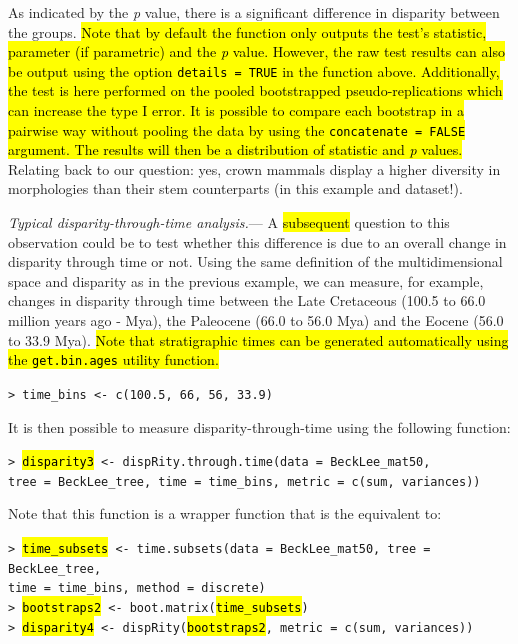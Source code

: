 \documentclass[12pt,letterpaper]{article}
\renewcommand{\subsubsection}[1]{%
\vspace{2ex}
\noindent
\textit{#1.}---}
\begin{document}
\bigskip
As indicated by the \textit{p} value, there is a significant difference in disparity between the groups.
\hl{Note that by default the function only outputs the test's statistic, parameter (if parametric) and the \textit{p} value. However, the raw test results can also be output using the option \texttt{details = TRUE} in the function above.
Additionally, the test is here performed on the pooled bootstrapped pseudo-replications which can increase the type I error.
It is possible to compare each bootstrap in a pairwise way without pooling the data by using the \texttt{concatenate = FALSE} argument.
The results will then be a distribution of statistic and \textit{p} values.}
Relating back to our question: yes, crown mammals display a higher diversity in morphologies than their stem counterparts (in this example and dataset!).

\subsubsection{Typical disparity-through-time analysis}
A 
\hl{subsequent} 
question to this observation could be to test whether this difference is due to an overall change in disparity through time or not.
Using the same definition of the multidimensional space and disparity as in the previous example, we can measure, for example, changes in disparity through time between the Late Cretaceous (100.5 to 66.0 million years ago - Mya), the Paleocene (66.0 to 56.0 Mya) and the Eocene (56.0 to 33.9 Mya).
\hl{Note that stratigraphic times can be generated automatically using the \texttt{get.bin.ages} utility function.}

\noindent
\texttt{> time\_bins <- c(100.5, 66, 56, 33.9)}

It is then possible to measure disparity-through-time using the following function:

\noindent
\texttt{> \hl{disparity3} <- dispRity.through.time(data = BeckLee\_mat50,}\\
\texttt{tree = BeckLee\_tree, time = time\_bins, metric = c(sum, variances))}

\noindent Note that this function is a wrapper function that is the equivalent to:

\noindent \texttt{> \hl{time\_subsets} <- time.subsets(data = BeckLee\_mat50, tree = BeckLee\_tree,}\\ \texttt{time = time\_bins, method = \textquotedbl discrete\textquotedbl)}\\
\noindent \texttt{> \hl{bootstraps2} <- boot.matrix(\hl{time\_subsets})}\\
\noindent \texttt{> \hl{disparity4} <- dispRity(\hl{bootstraps2}, metric = c(sum, variances))}\\
\end{document}
